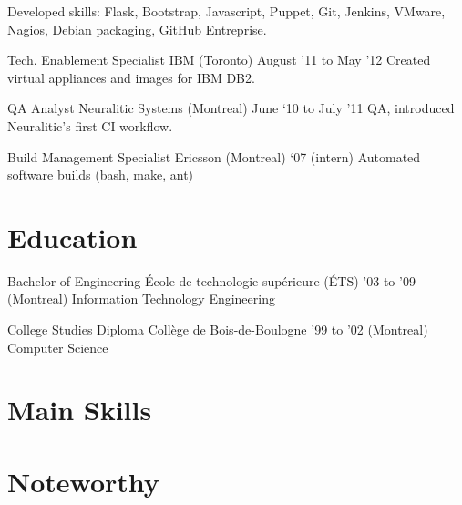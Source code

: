 \documentclass[]{cvpn}
\begin{document}
\begin{multicols}{2}
\begin{eventlist}
{Developed skills: Flask, Bootstrap, Javascript,
Puppet, Git, Jenkins, VMware, Nagios, Debian packaging,
GitHub Entreprise.
}

\item{Tech. Enablement Specialist}
     {IBM (Toronto)}
     {August '11 to May '12}
{
Created virtual appliances and images for IBM DB2.
}

\item{QA Analyst}
     {Neuralitic Systems (Montreal)}
     {June ‘10 to July ’11}
{
QA, introduced Neuralitic's first CI workflow.
}

\item{Build Management Specialist}
     {Ericsson (Montreal)}
     {‘07 (intern)}
{
Automated software builds (bash, make, ant)
}

\end{eventlist}

\section{Education}
\begin{eventlist}

\item{Bachelor of Engineering}
     {École de technologie supérieure (ÉTS)}
     {'03 to '09}
{
(Montreal) Information Technology Engineering
}

\item{College Studies Diploma}
     {Collège de Bois-de-Boulogne}
     {'99 to '02}
{
(Montreal) Computer Science
}

\end{eventlist}

\section{Main Skills}
\begin{skillslist}


\end{skillslist}

\section{Noteworthy}


\end{multicols}
\end{document}
